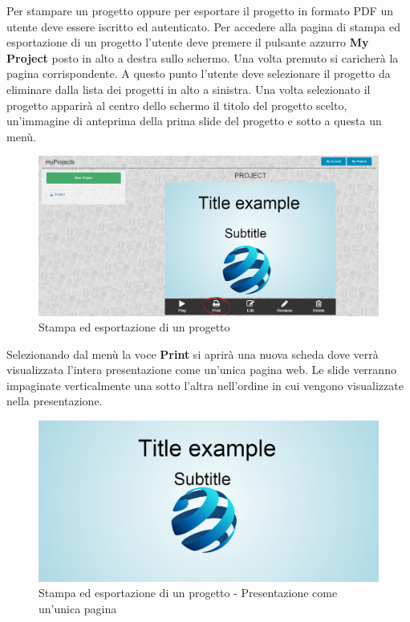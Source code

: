 Per stampare un progetto oppure per esportare il progetto in formato PDF un utente deve essere iscritto ed autenticato. Per accedere alla pagina di stampa ed esportazione di un progetto l'utente deve premere il pulsante azzurro \textbf{My Project} posto in alto a destra sullo schermo. Una volta premuto si caricherà la pagina corrispondente. A questo punto l'utente deve selezionare il progetto da eliminare dalla lista dei progetti in alto a sinistra.
Una volta selezionato il progetto apparirà al centro dello schermo il titolo del progetto scelto, un'immagine di anteprima della prima slide del progetto e sotto a questa un menù. 

\begin{figure}[H] 
	\centering 
	\includegraphics[scale=0.40] {img/stampa_pro.png}
	\caption{Stampa ed esportazione di un progetto} 
\end{figure}

\noindent Selezionando dal menù la voce \textbf{Print} si aprirà una nuova scheda dove verrà visualizzata l'intera presentazione come un'unica pagina web. Le slide verranno impaginate verticalmente una sotto l'altra nell'ordine in cui vengono visualizzate nella presentazione.

\begin{figure}[H] 
	\centering 
	\includegraphics[scale=0.40] {img/print.png}
	\caption{Stampa ed esportazione di un progetto - Presentazione come un'unica pagina} 
\end{figure}

